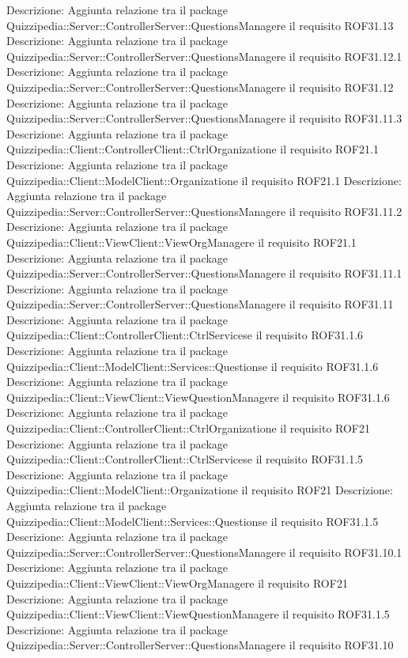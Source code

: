 Descrizione: Aggiunta relazione tra il package Quizzipedia::Server::ControllerServer::QuestionsManagere il requisito ROF31.13 
Descrizione: Aggiunta relazione tra il package Quizzipedia::Server::ControllerServer::QuestionsManagere il requisito ROF31.12.1 
Descrizione: Aggiunta relazione tra il package Quizzipedia::Server::ControllerServer::QuestionsManagere il requisito ROF31.12 
Descrizione: Aggiunta relazione tra il package Quizzipedia::Server::ControllerServer::QuestionsManagere il requisito ROF31.11.3 
Descrizione: Aggiunta relazione tra il package Quizzipedia::Client::ControllerClient::CtrlOrganizatione il requisito ROF21.1 
Descrizione: Aggiunta relazione tra il package Quizzipedia::Client::ModelClient::Organizatione il requisito ROF21.1 
Descrizione: Aggiunta relazione tra il package Quizzipedia::Server::ControllerServer::QuestionsManagere il requisito ROF31.11.2 
Descrizione: Aggiunta relazione tra il package Quizzipedia::Client::ViewClient::ViewOrgManagere il requisito ROF21.1 
Descrizione: Aggiunta relazione tra il package Quizzipedia::Server::ControllerServer::QuestionsManagere il requisito ROF31.11.1 
Descrizione: Aggiunta relazione tra il package Quizzipedia::Server::ControllerServer::QuestionsManagere il requisito ROF31.11 
Descrizione: Aggiunta relazione tra il package Quizzipedia::Client::ControllerClient::CtrlServicese il requisito ROF31.1.6 
Descrizione: Aggiunta relazione tra il package Quizzipedia::Client::ModelClient::Services::Questionse il requisito ROF31.1.6 
Descrizione: Aggiunta relazione tra il package Quizzipedia::Client::ViewClient::ViewQuestionManagere il requisito ROF31.1.6 
Descrizione: Aggiunta relazione tra il package Quizzipedia::Client::ControllerClient::CtrlOrganizatione il requisito ROF21 
Descrizione: Aggiunta relazione tra il package Quizzipedia::Client::ControllerClient::CtrlServicese il requisito ROF31.1.5 
Descrizione: Aggiunta relazione tra il package Quizzipedia::Client::ModelClient::Organizatione il requisito ROF21 
Descrizione: Aggiunta relazione tra il package Quizzipedia::Client::ModelClient::Services::Questionse il requisito ROF31.1.5 
Descrizione: Aggiunta relazione tra il package Quizzipedia::Server::ControllerServer::QuestionsManagere il requisito ROF31.10.1 
Descrizione: Aggiunta relazione tra il package Quizzipedia::Client::ViewClient::ViewOrgManagere il requisito ROF21 
Descrizione: Aggiunta relazione tra il package Quizzipedia::Client::ViewClient::ViewQuestionManagere il requisito ROF31.1.5 
Descrizione: Aggiunta relazione tra il package Quizzipedia::Server::ControllerServer::QuestionsManagere il requisito ROF31.10 
